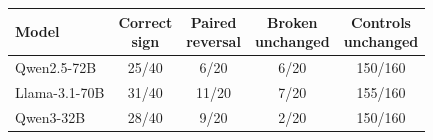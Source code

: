 \begin{tabular}{@{}lcccc@{}}
\toprule
Model & \shortstack{Correct\\sign} & \shortstack{Paired\\reversal} & \shortstack{Broken\\unchanged} & \shortstack{Controls\\unchanged} \\
\midrule
Qwen2.5-72B & 25/40 & 6/20 & 6/20 & 150/160 \\
Llama-3.1-70B & 31/40 & 11/20 & 7/20 & 155/160 \\
Qwen3-32B & 28/40 & 9/20 & 2/20 & 150/160 \\
\bottomrule
\end{tabular}
